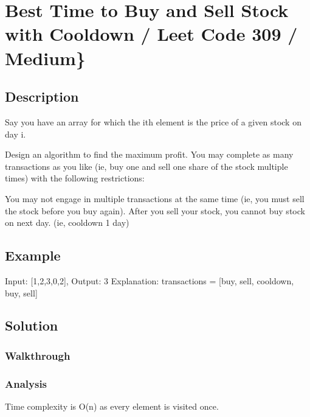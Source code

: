 \documentclass[]{book}
\begin{document}
\hypertarget{best-time-to-buy-and-sell-stock-with-cooldown-leet-code-309-medium}{%
\section{Best Time to Buy and Sell Stock with Cooldown / Leet Code 309 / Medium\}}\label{best-time-to-buy-and-sell-stock-with-cooldown-leet-code-309-medium}}

\hypertarget{description-36}{%
\subsection{Description}\label{description-36}}

Say you have an array for which the ith element is the price of a given stock on day i.

Design an algorithm to find the maximum profit. You may complete as many transactions as you like (ie, buy one and
sell one share of the stock multiple times) with the following restrictions:

You may not engage in multiple transactions at the same time (ie, you must sell the stock before you buy again).
After you sell your stock, you cannot buy stock on next day. (ie, cooldown 1 day)

\hypertarget{example-35}{%
\subsection{Example}\label{example-35}}

Input: {[}1,2,3,0,2{]}, Output: 3
Explanation: transactions = {[}buy, sell, cooldown, buy, sell{]}

\hypertarget{solution-29}{%
\subsection{Solution}\label{solution-29}}

\hypertarget{walkthrough-35}{%
\subsubsection{Walkthrough}\label{walkthrough-35}}

\hypertarget{analysis-38}{%
\subsubsection{Analysis}\label{analysis-38}}

Time complexity is O(n) as every element is visited once.
\end{document}
